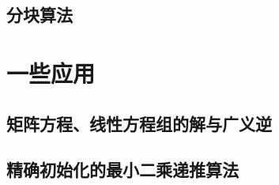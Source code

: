 \subsection{分块算法}
\label{sub:分块算法}

\section{一些应用}
\label{sec:一些应用}

\subsection{矩阵方程、线性方程组的解与广义逆}
\label{sub:矩阵方程、线性方程组的解与广义逆}

\subsection{精确初始化的最小二乘递推算法}
\label{sub:精确初始化的最小二乘递推算法}


